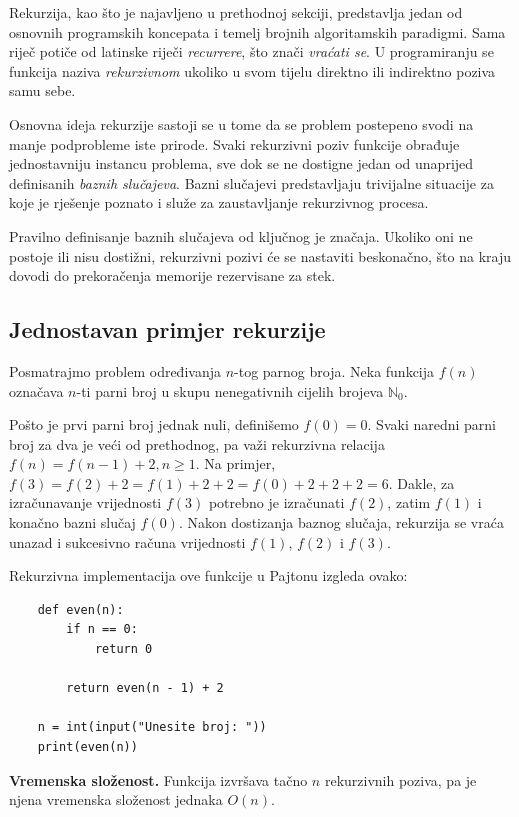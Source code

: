 Rekurzija, kao što je najavljeno u prethodnoj sekciji, predstavlja jedan od osnovnih programskih koncepata i temelj brojnih algoritamskih paradigmi. Sama riječ potiče od latinske riječi \textit{recurrere}, što znači \emph{vraćati se}. U programiranju se funkcija naziva \textit{rekurzivnom} ukoliko u svom tijelu direktno ili indirektno poziva samu sebe.

Osnovna ideja rekurzije sastoji se u tome da se problem postepeno svodi na manje podprobleme iste prirode. Svaki rekurzivni poziv funkcije obrađuje jednostavniju instancu problema, sve dok se ne dostigne jedan od unaprijed definisanih \textit{baznih slučajeva}. Bazni slučajevi predstavljaju trivijalne situacije za koje je rješenje poznato i služe za zaustavljanje rekurzivnog procesa.

Pravilno definisanje baznih slučajeva od ključnog je značaja. Ukoliko oni ne postoje ili nisu dostižni, rekurzivni pozivi će se nastaviti beskonačno, što na kraju dovodi do prekoračenja memorije rezervisane za stek.

\subsection{Jednostavan primjer rekurzije}

Posmatrajmo problem određivanja $n$-tog parnog broja. Neka funkcija $f(n)$ označava $n$-ti parni broj u skupu nenegativnih cijelih brojeva $\mathbb{N}_0$.

Pošto je prvi parni broj jednak nuli, definišemo $
f(0)=0.$  Svaki naredni parni broj za dva je veći od prethodnog, pa važi rekurzivna relacija $f(n)=f(n-1)+2, n\geq 1.$ Na primjer, $f(3)=f(2)+2=f(1)+2+2=f(0)+2+2+2=6.$  Dakle, za izračunavanje vrijednosti $f(3)$ potrebno je izračunati $f(2)$, zatim $f(1)$ i konačno bazni slučaj $f(0)$. Nakon dostizanja baznog slučaja, rekurzija se vraća unazad i sukcesivno računa vrijednosti $f(1)$, $f(2)$ i $f(3)$.

Rekurzivna implementacija ove funkcije u Pajtonu izgleda ovako:

\begin{verbatim}
	def even(n):
	    if n == 0:
	        return 0
	
	    return even(n - 1) + 2

	n = int(input("Unesite broj: "))
	print(even(n))
\end{verbatim}

\textbf{Vremenska složenost.}
Funkcija izvršava tačno $n$ rekurzivnih poziva, pa je njena vremenska složenost jednaka $
O(n).$

